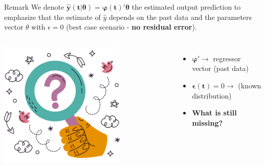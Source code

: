 \documentclass[aspectratio=169,hyperref={pdfpagelabels=false}]{beamer}
\begin{document}
\begin{frame}{}
  \begin{block}{Remark}
    We denote $\bm{\hat{y}(t|\theta) = \varphi(t)'\theta}$ the estimated output prediction
  to emphasize that the estimate of $\hat{y}$ depends on the past data and the parameters vector $\theta$ with $\epsilon=0$ (best case scenario - \textbf{no residual error}).
  \end{block}\pause
  
  \vspace{2em}  
  \begin{columns}
     \includegraphics[width=0.7\textwidth]{img/pic5.png} \centering \pause
    \begin{itemize}
      \item $\bm{\varphi}' \rightarrow$ regressor vector (past data)
      \item $\bm{\epsilon(t)} = 0 \rightarrow $ (known distribution)
      \item[] \vspace{2em} \hspace{2em}\textbf{What is still missing?}   \pause
    \end{itemize}
    \end{columns}
\end{frame}
\end{document}
